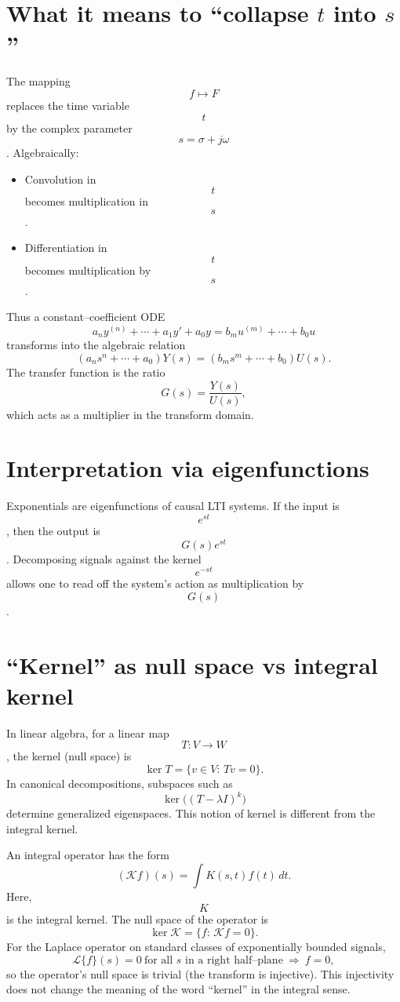 \documentclass[12pt,a4paper]{article}
\begin{document}
	\section*{What it means to ``collapse \( t \) into \( s \)''}
	The mapping $$f\mapsto F$$ replaces the time variable $$t$$ by the complex parameter $$s=\sigma+j\omega$$. Algebraically:
	\begin{itemize}
		\item Convolution in $$t$$ becomes multiplication in $$s$$.
		\item Differentiation in $$t$$ becomes multiplication by $$s$$.
	\end{itemize}
	Thus a constant--coefficient ODE
	$$
	a_n y^{(n)}+\cdots+a_1 y'+a_0 y=b_m u^{(m)}+\cdots+b_0 u
	$$
	transforms into the algebraic relation
	$$
	(a_n s^{n}+\cdots+a_0)Y(s)=(b_m s^{m}+\cdots+b_0)U(s).
	$$
	The transfer function is the ratio
	$$
	G(s)=\frac{Y(s)}{U(s)},
	$$
	which acts as a multiplier in the transform domain.
	
	\section*{Interpretation via eigenfunctions}
	Exponentials are eigenfunctions of causal LTI systems. If the input is $$e^{st}$$, then the output is $$G(s)e^{st}$$. Decomposing signals against the kernel $$e^{-st}$$ allows one to read off the system's action as multiplication by $$G(s)$$.
	
	\section*{``Kernel'' as null space vs integral kernel}
	In linear algebra, for a linear map $$T:V\to W$$, the kernel (null space) is
	$$
	\ker T=\{v\in V:\, T v=0\}.
	$$
	In canonical decompositions, subspaces such as $$\ker\big((T-\lambda I)^k\big)$$ determine generalized eigenspaces. This notion of kernel is different from the integral kernel.
	
	An integral operator has the form
	$$
	(\mathcal{K}f)(s)=\int K(s,t)f(t)\,dt.
	$$
	Here, $$K$$ is the integral kernel. The null space of the operator is
	$$
	\ker \mathcal{K}=\{f:\, \mathcal{K}f=0\}.
	$$
	For the Laplace operator on standard classes of exponentially bounded signals,
	$$
	\mathcal{L}\{f\}(s)=0 \ \text{for all } s \text{ in a right half--plane} \ \Longrightarrow \ f=0,
	$$
	so the operator's null space is trivial (the transform is injective). This injectivity does not change the meaning of the word ``kernel'' in the integral sense.
	

	
\end{document}
